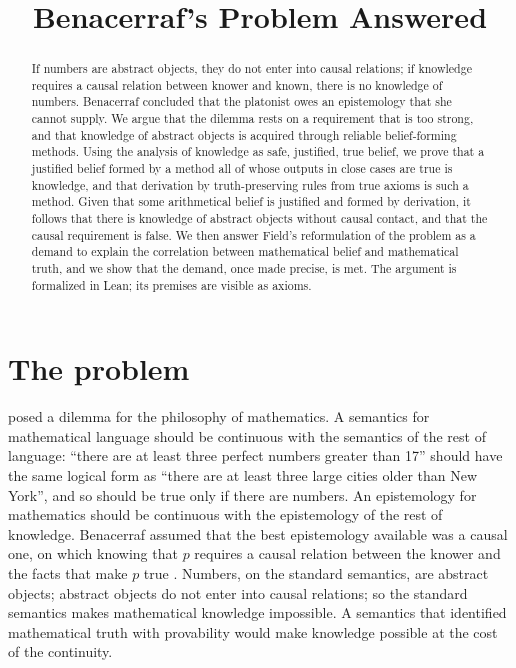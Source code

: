 \documentclass{situationist-preprint}
\title{Benacerraf's Problem Answered}
\begin{document}
\maketitle

\begin{abstract}
If numbers are abstract objects, they do not enter into causal relations; if knowledge requires a causal relation between knower and known, there is no knowledge of numbers. Benacerraf concluded that the platonist owes an epistemology that she cannot supply. We argue that the dilemma rests on a requirement that is too strong, and that knowledge of abstract objects is acquired through reliable belief-forming methods. Using the analysis of knowledge as safe, justified, true belief, we prove that a justified belief formed by a method all of whose outputs in close cases are true is knowledge, and that derivation by truth-preserving rules from true axioms is such a method. Given that some arithmetical belief is justified and formed by derivation, it follows that there is knowledge of abstract objects without causal contact, and that the causal requirement is false. We then answer Field's reformulation of the problem as a demand to explain the correlation between mathematical belief and mathematical truth, and we show that the demand, once made precise, is met. The argument is formalized in Lean; its premises are visible as axioms.
\end{abstract}

\section{The problem}

\citet{Benacerraf1973} posed a dilemma for the philosophy of mathematics. A semantics for mathematical language should be continuous with the semantics of the rest of language: \enquote{there are at least three perfect numbers greater than 17} should have the same logical form as \enquote{there are at least three large cities older than New York}, and so should be true only if there are numbers. An epistemology for mathematics should be continuous with the epistemology of the rest of knowledge. Benacerraf assumed that the best epistemology available was a causal one, on which knowing that $p$ requires a causal relation between the knower and the facts that make $p$ true \citep{Goldman1967}. Numbers, on the standard semantics, are abstract objects; abstract objects do not enter into causal relations; so the standard semantics makes mathematical knowledge impossible. A semantics that identified mathematical truth with provability would make knowledge possible at the cost of the continuity.
\end{document}
